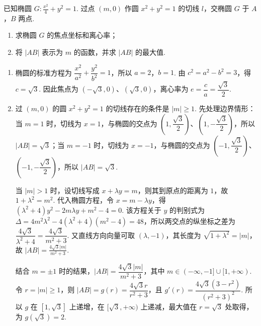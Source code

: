 \begin{problem}
已知椭圆 \(G: \frac{x^2}{4} + y^2 = 1\). 过点 \((m, 0)\) 作圆 \(x^2 + y^2 = 1\) 的切线 \(l\)，交椭圆 \(G\) 于 \(A\)，\(B\) 两点.

\begin{enumerate}
\item 求椭圆 \(G\) 的焦点坐标和离心率；
\item 将 \(\left|AB\right|\) 表示为 \(m\) 的函数，并求 \(\left|AB\right|\) 的最大值.
\end{enumerate}

\begin{solution}
\begin{enumerate}
\item 椭圆的标准方程为 \(\dfrac{x^2}{a^2}+\dfrac{y^2}{b^2}=1\)，所以 \(a=2\)，\(b=1\). 由 \(c^2=a^2-b^2=3\)，得 \(c=\sqrt3\). 因此焦点为 \((-\sqrt3,0)\)、\((\sqrt3,0)\)，离心率为 \(e=\dfrac ca=\dfrac{\sqrt3}{2}\).
\item 过 \((m,0)\) 的圆 \(x^2+y^2=1\) 的切线存在的条件是 \(|m|\geqslant1\). 先处理边界情形：当 \(m=1\) 时，切线为 \(x=1\)，与椭圆的交点为 \(\left(1,\dfrac{\sqrt3}{2}\right)\)、\(\left(1,-\dfrac{\sqrt3}{2}\right)\)，所以 \(|AB|=\sqrt3\)；当 \(m=-1\) 时，切线为 \(x=-1\)，与椭圆的交点为 \(\left(-1,\dfrac{\sqrt3}{2}\right)\)、\(\left(-1,-\dfrac{\sqrt3}{2}\right)\)，所以 \(|AB|=\sqrt3\).

当 \(|m|>1\) 时，设切线写成 \(x+\lambda y=m\)，则其到原点的距离为 \(1\)，故 \(1+\lambda^2=m^2\). 代入椭圆方程，令 \(x=m-\lambda y\)，得
\((\lambda^2+4)y^2-2m\lambda y+m^2-4=0\). 该方程关于 \(y\) 的判别式为
\(\Delta=4m^2\lambda^2-4(\lambda^2+4)(m^2-4)=48\)，所以两交点的纵坐标之差为 \(\dfrac{4\sqrt3}{\lambda^2+4}=\dfrac{4\sqrt3}{m^2+3}\). 又直线方向向量可取 \((\lambda,-1)\)，其长度为 \(\sqrt{1+\lambda^2}=|m|\)，故
\(\displaystyle\left|AB\right|=\frac{4\sqrt{3}\left|m\right|}{m^2+3}\).

结合 \(m=\pm1\) 时的结果，\(|AB|=\dfrac{4\sqrt3|m|}{m^2+3}\)，其中 \(m\in(-\infty,-1]\cup[1,+\infty)\). 令 \(r=|m|\geqslant1\)，则 \(|AB|=g(r)=\dfrac{4\sqrt3r}{r^2+3}\)，且
\(g'(r)=\dfrac{4\sqrt3(3-r^2)}{(r^2+3)^2}\). 所以 \(g\) 在 \([1,\sqrt3]\) 上递增，在 \([\sqrt3,+\infty)\) 上递减，最大值在 \(r=\sqrt3\) 处取得，为 \(g(\sqrt3)=2\).
\end{enumerate}
\end{solution}
\end{problem}

